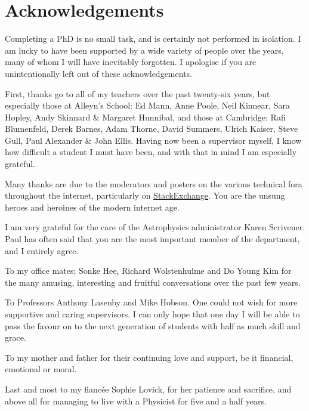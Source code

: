 \chapter{Acknowledgements}
Completing a PhD is no small task, and is certainly not performed in isolation. I am lucky to have been supported by a wide variety of people over the years, many of whom I will have inevitably forgotten. I apologise if you are unintentionally left out of these acknowledgements.

First, thanks go to all of my teachers over the past twenty-six years, but especially those at Alleyn's School: Ed Mann, Anne Poole, Neil Kinnear, Sara Hopley, Andy Skinnard \& Margaret Hunnibal, and those at Cambridge: Rafi Blumenfeld, Derek Barnes, Adam Thorne, David Summers, Ulrich Kaiser, Steve Gull, Paul Alexander \& John Ellis. Having now been a supervisor myself, I know how difficult a student I must have been, and with that in mind I am especially grateful.

Many thanks are due to the moderators and posters on the various technical fora throughout the internet, particularly on \mbox{\href{http://stackexchange.com/}{StackExchange}}. You are the unsung heroes and heroines of the modern internet age.

I am very grateful for the care of the Astrophysics administrator Karen Scrivener. Paul has often said that you are the most important member of the department, and I entirely agree.

To my office mates; Sonke Hee, Richard Wolstenhulme and Do Young Kim for the many amusing, interesting and fruitful conversations over the past few years. 

To Professors Anthony Lasenby and Mike Hobson. One could not wish for more supportive and caring supervisors. I can only hope that one day I will be able to pass the favour on to the next generation of students with half as much skill and grace.

To my mother and father for their continuing love and support, be it financial, emotional or moral.

Last and most to my fianc\'{e}e Sophie Lovick, for her patience and sacrifice, and above all for managing to live with a Physicist for five and a half years.
